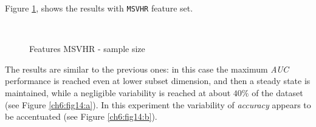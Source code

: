 Figure \ref{ch6:fig14}, shows the results with \texttt{MSVHR} feature set.


\begin{figure}[!htb]
  \centering
    \\
    \caption{Features MSVHR - sample size}
    \label{ch6:fig14}
\end{figure}

The results are similar to the previous ones: in this case the maximum \textit{AUC} performance is reached even at lower subset dimension, and then a steady state 
is maintained, while a negligible variability is reached at about $40\%$ of the dataset (see Figure \ref{ch6:fig14:a}). In this experiment the variability of
\textit{accuracy} appears to be accentuated (see Figure \ref{ch6:fig14:b}).


\vspace{0.5cm}


